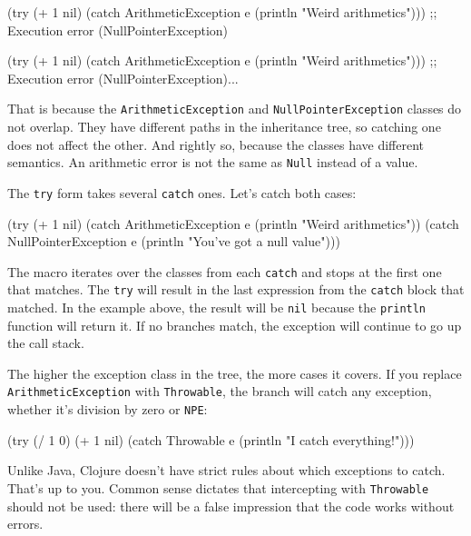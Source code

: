 \ifx\DEVICETYPE\MOBILE

\begin{clojure}
(try
  (+ 1 nil)
  (catch ArithmeticException e
    (println "Weird arithmetics")))
;; Execution error (NullPointerException)
\end{clojure}

\else

\begin{clojure}
(try
  (+ 1 nil)
  (catch ArithmeticException e
    (println "Weird arithmetics")))
;; Execution error (NullPointerException)...
\end{clojure}

\fi


That is because the \verb|ArithmeticException| and \verb|NullPointerException| classes do not overlap. They have different paths in the inheritance tree, so catching one does not affect the other. And rightly so, because the classes have different semantics. An arithmetic error is not the same as \verb|Null| instead of a value.


The \verb|try| form takes several \verb|catch| ones. Let's catch both cases:

\begin{clojure}
(try
  (+ 1 nil)
  (catch ArithmeticException e
    (println "Weird arithmetics"))
  (catch NullPointerException e
    (println "You've got a null value")))
\end{clojure}

The macro iterates over the classes from each \verb|catch| and stops at the first one that matches. The \verb|try| will result in the last expression from the \verb|catch| block that matched. In the example above, the result will be \verb|nil| because the \verb|println| function will return it. If no branches match, the exception will continue to go up the call stack.


The higher the exception class in the tree, the more cases it covers. If you replace \verb|ArithmeticException| with \verb|Throwable|, the branch will catch any exception, whether it's division by zero or \verb|NPE|:

\begin{clojure}
(try
  (/ 1 0)
  (+ 1 nil)
  (catch Throwable e
    (println "I catch everything!")))
\end{clojure}

Unlike Java, Clojure doesn't have strict rules about which exceptions to catch. That's up to you. Common sense dictates that intercepting with \verb|Throwable| should not be used: there will be a false impression that the code works without errors.

